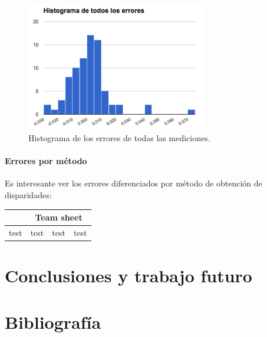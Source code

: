 \documentclass[11pt,a4paper,titlepage]{article}
\begin{document}
\begin{figure}[h!]

  \centering
    \includegraphics[width=0.7\textwidth]{f11.png}
  \caption{Histograma de los errores de todas las mediciones.}
\end{figure}

\paragraph{Errores por método}
\hfill \break
Es interesante ver los errores diferenciados por método de obtención de disparidades:

\begin{tabular}{ |c|c|c|c| }
  \hline
  & \multicolumn{3}{|c|}{Team sheet} \\
  \hline
  test & test & test & test \\
  \hline
\end{tabular}

\newpage

\section{Conclusiones y trabajo futuro}

\newpage

\section{Bibliografía}
\end{document}
